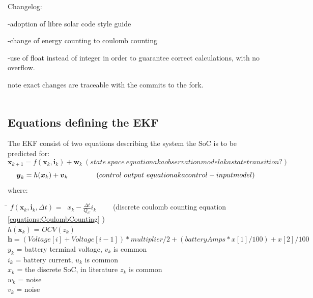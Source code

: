 Changelog: 



-adoption of libre solar code style guide 

-change of energy counting to coulomb counting

-use of float instead of integer in order to guarantee correct calculations, with no overflow. 

note exact changes are traceable with the commits to the fork. 
\\
\
\
\


\subsection{Equations defining the EKF}
\label{System's dynamic model}


The EKF consist of two equations describing the system the SoC is to be predicted for:
\begin{equation}
  {\boldsymbol {x}}_{k+1}=f({\boldsymbol {x}}_{k},{\boldsymbol {i}}_{k})+ {\boldsymbol {w}}_{k}  \ (state\ space\ equation aka observation model aka state transition ?)  
\end{equation}
\begin{equation}
  \boldsymbol  y_{k}=h({\boldsymbol  {x}}_{{k}})+{\boldsymbol  {v}}_{{k}}  \ \ \ \ \ \ \ \ \ \ \  \ (control\ output\ equation aka control-input model)  \\
\end{equation}
where: 
\begin{tabbing}
\phantom{$v(t)  \  \ \ \ \ \ \ \ \ \ \ \ \ \ \ \ \ \ $}\= \kill
$f({\boldsymbol {x}}_{k},{\boldsymbol {i}}_{k},\Delta{t})$\> =  \ $ {x}_{k} - \frac{\Delta t}{Q_{C}} i_{k} $ \ \ \ \ (discrete coulomb counting equation \ref{equations:CoulombCounting} ) \\
$h({\boldsymbol {x}}_{{k}})$\> = $OCV(z_{k})$ \\  $ \boldsymbol{h} = (Voltage[i] + Voltage[i - 1]) * multiplier / 2 + (batteryAmps * x[1] / 100) + x[2] / 100$\\ %
$y_{k}$\> =  battery terminal voltage,  $v_{k}$ is common  \\
$i_{k}$\> =   battery current, $u_{k}$ is common  \\ %
$x_{k}$\> = the discrete SoC, in literature $z_{k}$ is common \\ %
$w_{k}$\> = noise    \\ %
$v_{k}$\> = noise    \\ %
\end{tabbing}	

